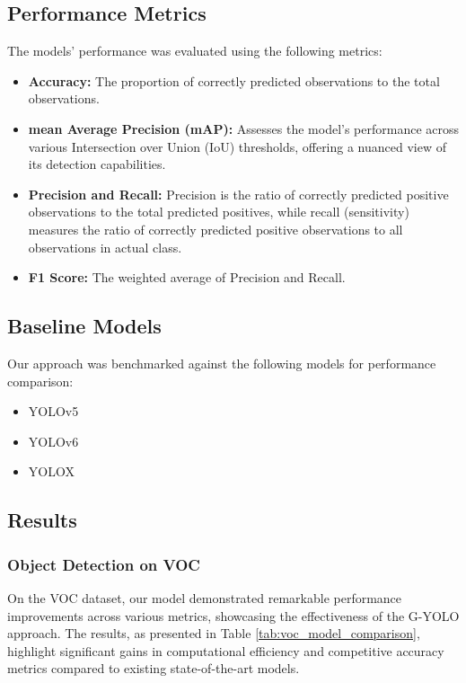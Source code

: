 \subsection{Performance Metrics}

The models' performance was evaluated using the following metrics:
\begin{itemize}
    \item \textbf{Accuracy:} The proportion of correctly predicted observations to the total observations.
    \item \textbf{mean Average Precision (mAP):} Assesses the model's performance across various Intersection over Union (IoU) thresholds, offering a nuanced view of its detection capabilities.
    \item \textbf{Precision and Recall:} Precision is the ratio of correctly predicted positive observations to the total predicted positives, while recall (sensitivity) measures the ratio of correctly predicted positive observations to all observations in actual class.
    \item \textbf{F1 Score:} The weighted average of Precision and Recall.
\end{itemize}

\subsection{Baseline Models}

Our approach was benchmarked against the following models for performance comparison:
\begin{itemize}
    \item YOLOv5~\cite{ultralytics2021yolov5}
    \item YOLOv6~\cite{li2022yolov6,li2023yolov6}
    \item YOLOX~\cite{ge2021yolox}
\end{itemize}

\subsection{Results}

\subsubsection{Object Detection on VOC}

On the VOC dataset, our model demonstrated remarkable performance improvements across various metrics, showcasing the effectiveness of the G-YOLO approach. The results, as presented in Table \ref{tab:voc_model_comparison}, highlight significant gains in computational efficiency and competitive accuracy metrics compared to existing state-of-the-art models.

